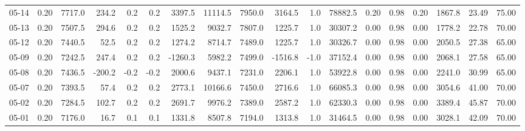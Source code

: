 \begin{threeparttable}
{\begin{tabular}{lrrrrrrrrrrrrrrrrr}
  05-14 &     0.20 & 7717.0 &             234.2 &               0.2 &                0.2 &             3397.5 & 11114.5 & 7950.0 &     3164.5 &                      1.0 &             78882.5 &       0.20 &      0.98 &           0.20 &           1867.8 &           23.49 &                  75.00 \\
  05-13 &     0.20 & 7507.5 &             294.6 &               0.2 &                0.2 &             1525.2 &  9032.7 & 7807.0 &     1225.7 &                      1.0 &             30307.2 &       0.00 &      0.98 &           0.00 &           1778.2 &           22.78 &                  70.00 \\
  05-12 &     0.20 & 7440.5 &              52.5 &               0.2 &                0.2 &             1274.2 &  8714.7 & 7489.0 &     1225.7 &                      1.0 &             30326.7 &       0.00 &      0.98 &           0.00 &           2050.5 &           27.38 &                  65.00 \\
  05-09 &     0.20 & 7242.5 &             247.4 &               0.2 &                0.2 &            -1260.3 &  5982.2 & 7499.0 &    -1516.8 &                     -1.0 &             37152.4 &       0.00 &      0.98 &           0.00 &           2068.1 &           27.58 &                  65.00 \\
  05-08 &     0.20 & 7436.5 &            -200.2 &              -0.2 &               -0.2 &             2000.6 &  9437.1 & 7231.0 &     2206.1 &                      1.0 &             53922.8 &       0.00 &      0.98 &           0.00 &           2241.0 &           30.99 &                  65.00 \\
  05-07 &     0.20 & 7393.5 &              57.4 &               0.2 &                0.2 &             2773.1 & 10166.6 & 7450.0 &     2716.6 &                      1.0 &             66085.3 &       0.00 &      0.98 &           0.00 &           3054.6 &           41.00 &                  70.00 \\
  05-02 &     0.20 & 7284.5 &             102.7 &               0.2 &                0.2 &             2691.7 &  9976.2 & 7389.0 &     2587.2 &                      1.0 &             62330.3 &       0.00 &      0.98 &           0.00 &           3389.4 &           45.87 &                  70.00 \\
  05-01 &     0.20 & 7176.0 &              16.7 &               0.1 &                0.1 &             1331.8 &  8507.8 & 7194.0 &     1313.8 &                      1.0 &             31464.5 &       0.00 &      0.98 &           0.00 &           3028.1 &           42.09 &                  70.00 \\

\end{tabular}}
\end{threeparttable}
